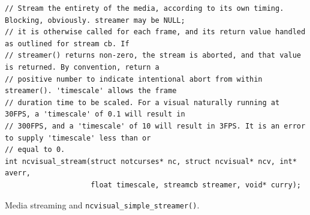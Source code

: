 \documentclass[letterpaper,10pt]{article}
\begin{document}
\begin{listing}[!htb]
\begin{verbatim}
// Stream the entirety of the media, according to its own timing. Blocking, obviously. streamer may be NULL;
// it is otherwise called for each frame, and its return value handled as outlined for stream cb. If
// streamer() returns non-zero, the stream is aborted, and that value is returned. By convention, return a
// positive number to indicate intentional abort from within streamer(). 'timescale' allows the frame
// duration time to be scaled. For a visual naturally running at 30FPS, a 'timescale' of 0.1 will result in
// 300FPS, and a 'timescale' of 10 will result in 3FPS. It is an error to supply 'timescale' less than or
// equal to 0.
int ncvisual_stream(struct notcurses* nc, struct ncvisual* ncv, int* averr,
                    float timescale, streamcb streamer, void* curry);
\end{verbatim}
\caption{Media streaming and \texttt{ncvisual\_simple\_streamer()}.}
\label{list:streaming}
\end{listing}
\end{document}
